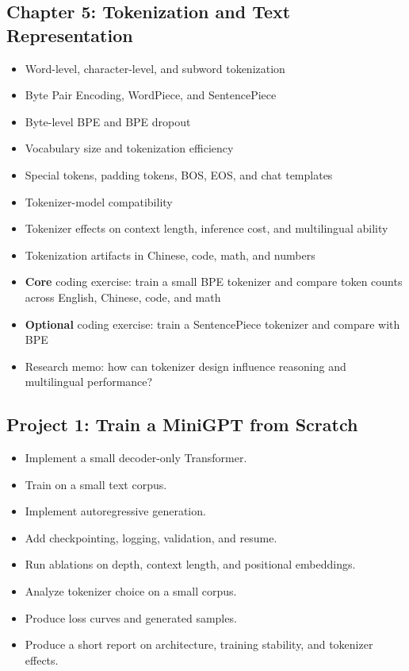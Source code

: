 \documentclass[11pt]{article}
\begin{document}
\subsection{Chapter 5: Tokenization and Text Representation}

\begin{itemize}
    \item Word-level, character-level, and subword tokenization
    \item Byte Pair Encoding, WordPiece, and SentencePiece
    \item Byte-level BPE and BPE dropout
    \item Vocabulary size and tokenization efficiency
    \item Special tokens, padding tokens, BOS, EOS, and chat templates
    \item Tokenizer-model compatibility
    \item Tokenizer effects on context length, inference cost, and multilingual ability
    \item Tokenization artifacts in Chinese, code, math, and numbers
    \item \textbf{Core} coding exercise: train a small BPE tokenizer and compare token counts across English, Chinese, code, and math
    \item \textbf{Optional} coding exercise: train a SentencePiece tokenizer and compare with BPE
    \item Research memo: how can tokenizer design influence reasoning and multilingual performance?
\end{itemize}

\subsection{Project 1: Train a MiniGPT from Scratch}

\begin{itemize}
    \item Implement a small decoder-only Transformer.
    \item Train on a small text corpus.
    \item Implement autoregressive generation.
    \item Add checkpointing, logging, validation, and resume.
    \item Run ablations on depth, context length, and positional embeddings.
    \item Analyze tokenizer choice on a small corpus.
    \item Produce loss curves and generated samples.
    \item Produce a short report on architecture, training stability, and tokenizer effects.
\end{itemize}
\end{document}
